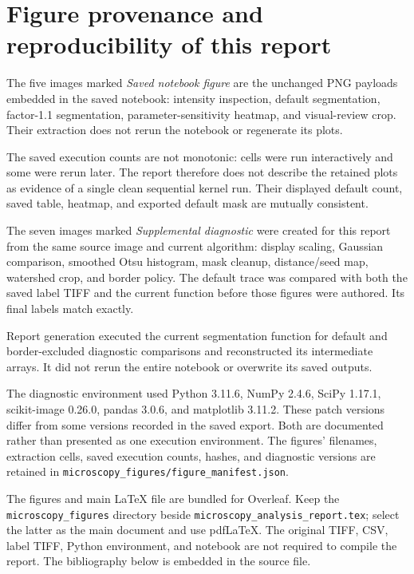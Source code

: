 \documentclass[11pt,letterpaper]{article}
\newcommand{\field}[1]{\nolinkurl{#1}}
\begin{document}
\section{Figure provenance and reproducibility of this report}
\label{app:provenance}

The five images marked \emph{Saved notebook figure} are the unchanged PNG payloads embedded in the saved notebook: intensity inspection, default segmentation, factor-1.1 segmentation, parameter-sensitivity heatmap, and visual-review crop. Their extraction does not rerun the notebook or regenerate its plots.

The saved execution counts are not monotonic: cells were run interactively and some were rerun later. The report therefore does not describe the retained plots as evidence of a single clean sequential kernel run. Their displayed default count, saved table, heatmap, and exported default mask are mutually consistent.

The seven images marked \emph{Supplemental diagnostic} were created for this report from the same source image and current algorithm: display scaling, Gaussian comparison, smoothed Otsu histogram, mask cleanup, distance/seed map, watershed crop, and border policy. The default trace was compared with both the saved label TIFF and the current function before those figures were authored. Its final labels match exactly.

Report generation executed the current segmentation function for default and border-excluded diagnostic comparisons and reconstructed its intermediate arrays. It did not rerun the entire notebook or overwrite its saved outputs.

The diagnostic environment used Python 3.11.6, NumPy 2.4.6, SciPy 1.17.1, scikit-image 0.26.0, pandas 3.0.6, and matplotlib 3.11.2. These patch versions differ from some versions recorded in the saved export. Both are documented rather than presented as one execution environment. The figures' filenames, extraction cells, saved execution counts, hashes, and diagnostic versions are retained in \field{microscopy_figures/figure_manifest.json}.

The figures and main \LaTeX{} file are bundled for Overleaf. Keep the \field{microscopy_figures} directory beside \field{microscopy_analysis_report.tex}; select the latter as the main document and use pdf\LaTeX{}. The original TIFF, CSV, label TIFF, Python environment, and notebook are not required to compile the report. The bibliography below is embedded in the source file.
\end{document}
